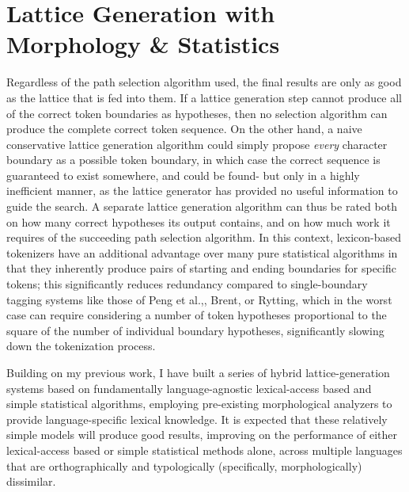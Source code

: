 \section{Lattice Generation with Morphology \& Statistics}

Regardless of the path selection algorithm used, the final results are only as good as the lattice that is fed into them. If a lattice generation step cannot produce all of the correct token boundaries as hypotheses, then no selection algorithm can produce the complete correct token sequence. On the other hand, a naive conservative lattice generation algorithm could simply propose \textit{every} character boundary as a possible token boundary, in which case the correct sequence is guaranteed to exist somewhere, and could be found- but only in a highly inefficient manner, as the lattice generator has provided no useful information to guide the search. A separate lattice generation algorithm can thus be rated both on how many correct hypotheses its output contains, and on how much work it requires of the succeeding path selection algorithm. In this context, lexicon-based tokenizers have an additional advantage over many pure statistical algorithms in that they inherently produce pairs of starting and ending boundaries for specific tokens; this significantly reduces redundancy compared to single-boundary tagging systems\cite{kudo04} like those of Peng et al.,\cite{peng04}, Brent\cite{brent99}, or Rytting\cite{rytting04}, which in the worst case can require considering a number of token hypotheses proportional to the square of the number of individual boundary hypotheses, significantly slowing down the tokenization process.

Building on my previous work, I have built a series of hybrid lattice-generation systems based on fundamentally language-agnostic lexical-access based and simple statistical algorithms, employing pre-existing morphological analyzers to provide language-specific lexical knowledge. It is expected that these relatively simple models will produce good results, improving on the performance of either lexical-access based or simple statistical methods alone, across multiple languages that are orthographically and typologically (specifically, morphologically) dissimilar.